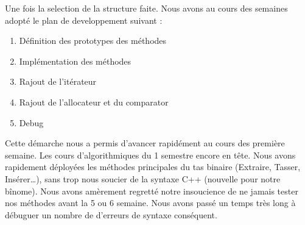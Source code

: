 Une fois la selection de la structure faite. Nous avons au cours des semaines adopté le plan de developpement suivant : 
\begin{enumerate}
\item
Définition des prototypes des méthodes
\item
Implémentation des méthodes
\item
Rajout de l'itérateur 
\item
Rajout de l'allocateur et du comparator
\item
Debug
\end{enumerate}
Cette démarche nous a permis d'avancer rapidément au cours des première semaine. Les cours d'algorithmiques du 1 semestre encore en tête. Nous avons rapidement déployées les méthodes principales du tas binaire (Extraire, Tasser, Insérer\dots), sans trop nous soucier de la syntaxe C++ (nouvelle pour notre bînome). Nous avons amèrement regretté notre insoucience de ne jamais tester nos méthodes avant la 5 ou 6 semaine. Nous avons passé un temps très long à débuguer un nombre de d'erreurs de syntaxe conséquent. 

